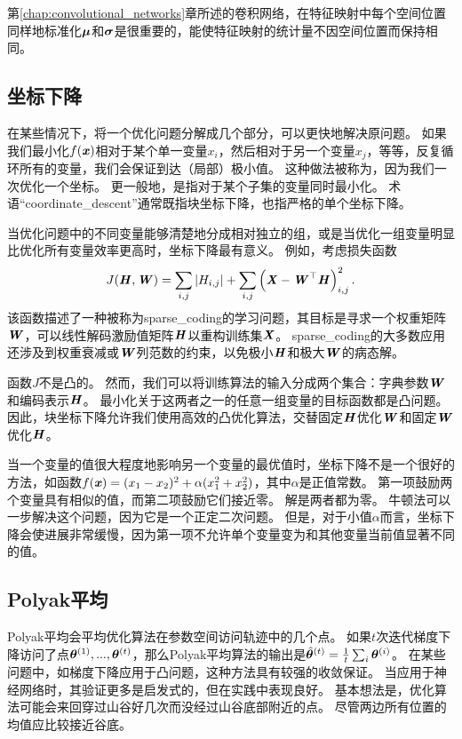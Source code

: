 第\ref{chap:convolutional_networks}章所述的卷积网络，在特征映射中每个空间位置同样地标准化$\boldsymbol{\mu}$和$\boldsymbol{\sigma}$是很重要的，能使特征映射的统计量不因空间位置而保持相同。

\subsection{坐标下降}
\label{sec:coordinate_descent}
在某些情况下，将一个优化问题分解成几个部分，可以更快地解决原问题。
如果我们最小化$f(\boldsymbol{\mathit{x}})$相对于某个单一变量$x_i$，然后相对于另一个变量$x_j$，等等，反复循环所有的变量，我们会保证到达（局部）极小值。
这种做法被称为，因为我们一次优化一个坐标。
更一般地，是指对于某个子集的变量同时最小化。
术语“\gls{coordinate_descent}”通常既指块坐标下降，也指严格的单个坐标下降。


当优化问题中的不同变量能够清楚地分成相对独立的组，或是当优化一组变量明显比优化所有变量效率更高时，坐标下降最有意义。
例如，考虑损失函数
\begin{equation}
    J(\boldsymbol{\mathit{H}}, \boldsymbol{\mathit{W}}) = \sum_{i,j} |H_{i,j}| + \sum_{i,j} \left( \boldsymbol{\mathit{X}} - \boldsymbol{\mathit{W}}^\top \boldsymbol{\mathit{H}} \right)_{i,j}^2 .
\end{equation}
该函数描述了一种被称为\gls{sparse_coding}的学习问题，其目标是寻求一个权重矩阵$\boldsymbol{\mathit{W}}$，可以线性解码激励值矩阵$\boldsymbol{\mathit{H}}$以重构训练集$\boldsymbol{\mathit{X}}$。
\gls{sparse_coding}的大多数应用还涉及到权重衰减或$\boldsymbol{\mathit{W}}$列范数的约束，以免极小$\boldsymbol{\mathit{H}}$和极大$\boldsymbol{\mathit{W}}$的病态解。

函数$J$不是凸的。
然而，我们可以将训练算法的输入分成两个集合：字典参数$\boldsymbol{\mathit{W}}$和编码表示$\boldsymbol{\mathit{H}}$。
最小化关于这两者之一的任意一组变量的目标函数都是凸问题。
因此，块坐标下降允许我们使用高效的凸优化算法，交替固定$\boldsymbol{\mathit{H}}$优化$\boldsymbol{\mathit{W}}$和固定$\boldsymbol{\mathit{W}}$优化$\boldsymbol{\mathit{H}}$。

当一个变量的值很大程度地影响另一个变量的最优值时，坐标下降不是一个很好的方法，如函数$f(\boldsymbol{\mathit{x}})=(x_1 - x_2)^2+\alpha(x_1^2 + x_2^2)$，其中$\alpha$是正值常数。
第一项鼓励两个变量具有相似的值，而第二项鼓励它们接近零。
解是两者都为零。
牛顿法可以一步解决这个问题，因为它是一个正定二次问题。
但是，对于小值$\alpha$而言，坐标下降会使进展非常缓慢，因为第一项不允许单个变量变为和其他变量当前值显著不同的值。


\subsection{Polyak平均}
\label{sec:polyak_averaging}
Polyak平均\citep{Polyak+Juditsky-1992}会平均优化算法在参数空间访问轨迹中的几个点。
如果$t$次迭代梯度下降访问了点$\boldsymbol{\theta}^{(1)},...,\boldsymbol{\theta}^{(t)}$，那么Polyak平均算法的输出是$\hat{\boldsymbol{\theta}}^{(t)} = \frac{1}{t} \sum_i \boldsymbol{\theta}^{(i)}$。
在某些问题中，如梯度下降应用于凸问题，这种方法具有较强的收敛保证。
当应用于神经网络时，其验证更多是启发式的，但在实践中表现良好。
基本想法是，优化算法可能会来回穿过山谷好几次而没经过山谷底部附近的点。
尽管两边所有位置的均值应比较接近谷底。

